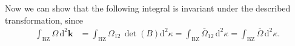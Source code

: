 \documentclass[english, parskip=full]{scrartcl}
\newcommand{\intx}{}
\newcommand{\tecxt}{}
\begin{document}
Now we can show that the following integral is invariant under the described transformation, since
\begin{align}
\intx\int_{\tecxt\text{BZ}}^{ } \Omega \, \mathrm{d}^2\mathbf{k} &= \intx\int_{\tecxt\text{BZ}}^{ } \Omega_{12} \, \det
 (B) \mathrm{d}^2\kappa = \intx\int_{\tecxt\text{BZ}}^{ } \bar{\Omega}_{12} \, \mathrm{d}^2\kappa = \intx\int_{\tecxt\text{BZ}}^{ } \bar{\Omega} \, \mathrm{d}^2\kappa.
\end{align}


\end{document}

